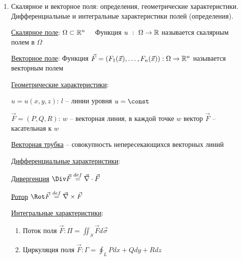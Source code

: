 \documentclass[12pt]{article}
\begin{document}
\begin{enumerate}
        $\text{проек.}_{Oxy} L = K_{xy}, \quad \text{проек.}_{Oxy} S = D_{xy}$

        В области $\Omega \supset S$ действуют функции $P, Q, R$ -- непрерывно дифференцируемы

        Тогда $\oint_{L^+} Pdx + Qdy + Rdz = \iint_{S^+} \left(\left(\frac{\partial R}{\partial y} - \frac{\partial Q}{\partial z}\right)\cos\alpha +
        \left(\frac{\partial P}{\partial z} - \frac{\partial R}{\partial x}\right)\cos\alpha + \left(\frac{\partial Q}{\partial x} - \frac{\partial P}{\partial y}\right)\cos\gamma\right) d\sigma$


        \item Скалярное и векторное поля: определения, геометрические характеристики. Дифференциальные и интегральные характеристики полей (определения).

        \hyperlink{scalarfield}{Скалярное поле}: $\Omega \subset \mathbb{R}^n \quad$ Функция $u \ : \ \Omega \to \mathbb{R}$ называется скалярным полем в $\Omega$

        \hyperlink{vectorfield}{Векторное поле}: Функция $\vec{F} = (F_1(\vec{x}), \dots, F_n(\vec{x})) : \Omega \to \mathbb{R}^n$ называется векторным полем

        \hyperlink{scalarandvectorfieldgeometric}{Геометрические характеристики}:

        $u = u(x, y, z)$: $l$ -- линии уровня $u = \const$

        $\vec{F} = (P, Q, R)$: $w$ -- векторная линия, в каждой точке $w$ вектор $\vec{F}$ -- касательная к $w$

        \underline{Векторная трубка} -- совокупность непересекающихся векторных линий

        \hyperlink{differentialcharacteristics}{Дифференциальные характеристики}:

        \hyperlink{divergence}{Дивергенция} $\Div \vec{F} \stackrel{def}{=} \vec\nabla \cdot \vec{F}$

        \hyperlink{rotor}{Ротор} $\Rot \vec{F} \stackrel{def}{=} \vec\nabla \times \vec{F}$

        \hyperlink{integralcharacteristics}{Интегральные характеристики}:

        \begin{enumerate}
            \item Поток поля $\vec{F}: \Pi = \iint_S \vec{F}d\vec{\sigma}$

            \item Циркуляция поля $\vec{F}: \Gamma = \oint_L Pdx + Qdy + Rdz$
        \end{enumerate}


\end{enumerate}
\end{document}
